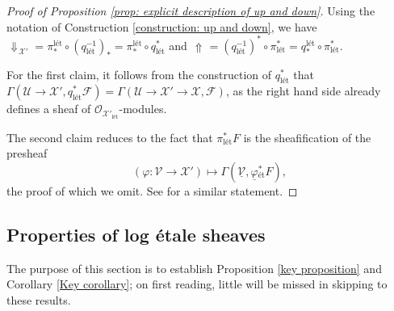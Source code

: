 \documentclass[11pt]{amsart}
\theoremstyle{definition}
\theoremstyle{definition}
\DeclareMathOperator{\arrowup}{\!\Uparrow \!}
\DeclareMathOperator{\arrowdown}{\!\Downarrow\!}
\newcommand{\cF}{\mathcal{F}}
\newcommand{\cO}{\mathcal{O}}
\newcommand{\cU}{\mathcal{U}}
\newcommand{\cV}{\mathcal{V}}
\newcommand{\cX}{\mathcal{X}}
\newcommand{\ul}[1]{\underline{#1}}
\newcommand{\cal}{\mathcal}
\def\cF{{\cal F}}
\def\cO{{\cal O}}
\def\cU{{\cal U}}
\def\cV{{\cal V}}
\def\cX{{\cal X}}
\begin{document}
\begin{proof}[Proof of Proposition \ref{prop: explicit description of up and down}]
Using the notation of Construction \ref{construction: up and down}, we have $\arrowdown_{\cX'}=\pi^{\text{l\'et}}_*\circ (q_{\text{l\'et}}^{-1})_* = \pi^{\text{l\'et}}_*\circ q_{\text{l\'et}}^*$ and $\arrowup=(q_{\text{l\'et}}^{-1})^*\circ \pi_{\text{l\'et}}^* = q^{\text{l\'et}}_*\circ \pi_{\text{l\'et}}^*$.

For the first claim, it follows from the construction of $q_{\text{l\'et}}^{*}$ that $\Gamma(\cU\rightarrow \cX',q_{\text{l\'et}}^{*}\cF) = \Gamma(\cU\rightarrow \cX'\rightarrow \cX,\mathcal{F})$, as the right hand side already defines a sheaf of $\cO_{\cX'_{\text{l\'et}}}$-modules. 

The second claim reduces to the fact that $\pi_{\text{l\'et}}^{*}F$ is the sheafification of the presheaf 
\[ (\varphi\colon \cV\rightarrow\cX')\longmapsto \Gamma(\ul{\cV},\ul{\varphi}{}_{\text{\'et}}^{*} F),\]
the proof of which we omit. See \cite[070S (2)]{stacks} for a similar statement.
\end{proof} 
\subsection{Properties of log \'etale sheaves} The purpose of this section is to establish Proposition \ref{key proposition} and Corollary \ref{Key corollary}; on first reading, little will be missed in skipping to these results. 
\end{document}
